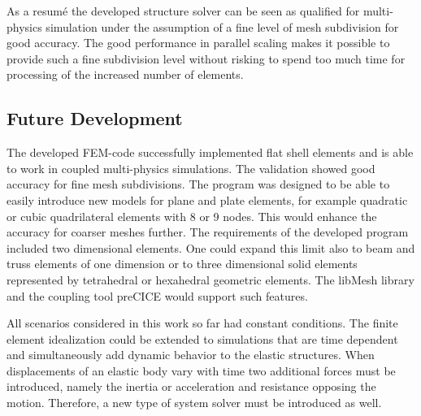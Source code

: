   As a resum\'{e} the developed structure solver can be seen as qualified for multi-physics simulation under the assumption of a fine level of mesh subdivision for good accuracy. The good performance in parallel scaling makes it possible to provide such a fine subdivision level without risking to spend too much time for processing of the increased number of elements.

 \subsection{Future Development}
  The developed FEM-code successfully implemented flat shell elements and is able to work in coupled multi-physics simulations. The validation showed good accuracy for fine mesh subdivisions. The program was designed to be able to easily introduce new models for plane and plate elements, for example quadratic or cubic quadrilateral elements with 8 or 9 nodes. This would enhance the accuracy for coarser meshes further. The requirements of the developed program included two dimensional elements. One could expand this limit also to beam and truss elements of one dimension or to three dimensional solid elements represented by tetrahedral or hexahedral geometric elements. The libMesh library and the coupling tool preCICE would support such features.
  
  All scenarios considered in this work so far had constant conditions. The finite element idealization could be extended to simulations that are time dependent and simultaneously add dynamic behavior to the elastic structures. When displacements of an elastic body vary with time two additional forces must be introduced, namely the inertia or acceleration and resistance opposing the motion. Therefore, a new type of system solver must be introduced as well.
\newpage